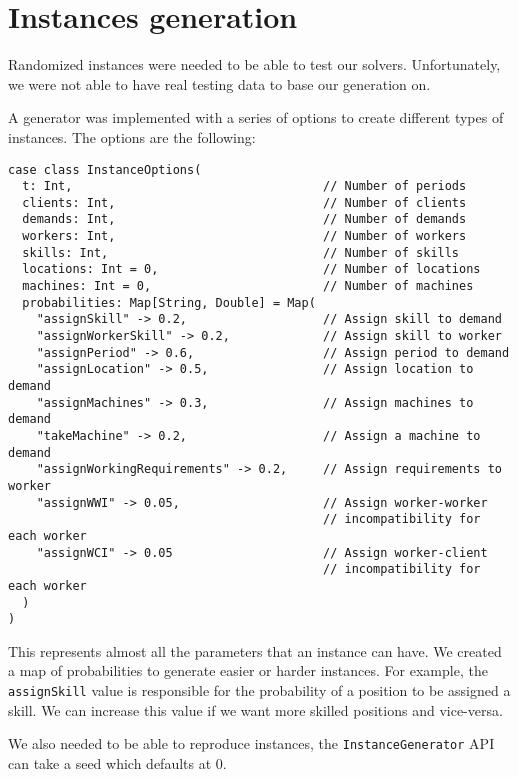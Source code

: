 \documentclass[../thesis.tex]{subfiles}
\begin{document}
\section{Instances generation}
\label{section:instance-gen}

Randomized instances were needed to be able to test our solvers. Unfortunately, we were not 
able to have real testing data to base our generation on. 

A generator was implemented with a series of options to create different types of instances. The options are the following:


\begin{lstlisting}[style=scalaStyle,label={instance:options},caption={Instance options},captionpos=b]
case class InstanceOptions(
  t: Int,                                   // Number of periods 
  clients: Int,                             // Number of clients 
  demands: Int,                             // Number of demands 
  workers: Int,                             // Number of workers 
  skills: Int,                              // Number of skills 
  locations: Int = 0,                       // Number of locations 
  machines: Int = 0,                        // Number of machines
  probabilities: Map[String, Double] = Map(
    "assignSkill" -> 0.2,                   // Assign skill to demand
    "assignWorkerSkill" -> 0.2,             // Assign skill to worker
    "assignPeriod" -> 0.6,                  // Assign period to demand
    "assignLocation" -> 0.5,                // Assign location to demand
    "assignMachines" -> 0.3,                // Assign machines to demand
    "takeMachine" -> 0.2,                   // Assign a machine to demand
    "assignWorkingRequirements" -> 0.2,     // Assign requirements to worker
    "assignWWI" -> 0.05,                    // Assign worker-worker 
                                            // incompatibility for each worker 
    "assignWCI" -> 0.05                     // Assign worker-client
                                            // incompatibility for each worker
  )
)
\end{lstlisting}

This represents almost all the parameters that an instance can have. We created a
map of probabilities to generate easier or harder instances. For example,
the \texttt{assignSkill} value is responsible for the probability of a position to be assigned a skill. 
We can increase this value if we want more skilled positions and vice-versa.

We also needed to be able to reproduce instances, the \texttt{InstanceGenerator} API can 
take a seed which defaults at $0$.
\end{document}
